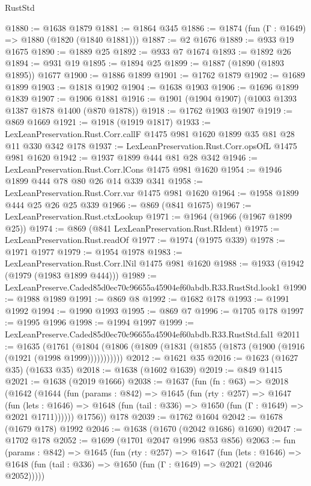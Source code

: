 \begin{lexlean}{RustStd}
\begin{coremodule}
@1880 := @1638 @1879
@1881 := @1864 @345
@1886 := @1874 (fun (Γ : @1649) => @1880 (@1820 (@1840 @1881)))
@1887 := @2 @1676
@1889 := @933 @19 @1675
@1890 := @1889 @25
@1892 := @933 @7 @1674
@1893 := @1892 @26
@1894 := @931 @19
@1895 := @1894 @25
@1899 := @1887 (@1890 (@1893 @1895)) @1677
@1900 := @1886 @1899
@1901 := @1762 @1879
@1902 := @1689 @1899
@1903 := @1818 @1902
@1904 := @1638 @1903
@1906 := @1696 @1899 @1839
@1907 := @1906 @1881
@1916 := @1901 (@1904 @1907) (@1003 @1393 @1387 @1878 @1400 (@870 @1878))
@1918 := @1762 @1903 @1907
@1919 := @869 @1669
@1921 := @1918 (@1919 @1817)
@1933 := LexLeanPreservation.Rust.Corr.callF @1475 @981 @1620 @1899 @35 @81 @28 @11 @330 @342 @178
@1937 := LexLeanPreservation.Rust.Corr.opsOfL @1475 @981 @1620
@1942 := @1937 @1899 @444 @81 @28 @342
@1946 := LexLeanPreservation.Rust.Corr.lCons @1475 @981 @1620
@1954 := @1946 @1899 @444 @78 @80 @26 @14 @339 @341
@1958 := LexLeanPreservation.Rust.Corr.var @1475 @981 @1620
@1964 := @1958 @1899 @444 @25 @26 @25 @339
@1966 := @869 (@841 @1675)
@1967 := LexLeanPreservation.Rust.ctxLookup
@1971 := @1964 (@1966 (@1967 @1899 @25))
@1974 := @869 (@841 LexLeanPreservation.Rust.RIdent)
@1975 := LexLeanPreservation.Rust.readOf
@1977 := @1974 (@1975 @339)
@1978 := @1971 @1977
@1979 := @1954 @1978
@1983 := LexLeanPreservation.Rust.Corr.lNil @1475 @981 @1620
@1988 := @1933 (@1942 (@1979 (@1983 @1899 @444)))
@1989 := LexLeanPreserve.Caded85d0ec70c96655a45904ef60abdb.R33.RustStd.look1
@1990 := @1988 @1989
@1991 := @869 @8
@1992 := @1682 @178
@1993 := @1991 @1992
@1994 := @1990 @1993
@1995 := @869 @7
@1996 := @1705 @178
@1997 := @1995 @1996
@1998 := @1994 @1997
@1999 := LexLeanPreserve.Caded85d0ec70c96655a45904ef60abdb.R33.RustStd.fal1
@2011 := @1635
    (@1761 (@1804 (@1806 (@1809 (@1831 (@1855 (@1873 (@1900 (@1916 (@1921 (@1998 @1999)))))))))))
@2012 := @1621 @35
@2016 := @1623 (@1627 @35) (@1633 @35)
@2018 := @1638 (@1602 @1639)
@2019 := @849 @1415
@2021 := @1638 (@2019 @1666)
@2038 := @1637
    (fun (fn : @63) =>
    @2018
      (@1642
        (@1644
          (fun (params : @842) =>
          @1645
            (fun (rty : @257) =>
            @1647
              (fun (lets : @1646) =>
              @1648 (fun (tail : @336) => @1650 (fun (Γ : @1649) => @2021 @1711))))))
        @1756))
    @178
@2039 := @1762 @1604
@2042 := @1678 (@1679 @178) @1992
@2046 := @1638 (@1670 (@2042 @1686) @1690)
@2047 := @1702 @178
@2052 := @1699 (@1701 @2047 @1996 @853 @856)
@2063 := fun (params : @842) =>
  @1645
    (fun (rty : @257) =>
    @1647
      (fun (lets : @1646) =>
      @1648 (fun (tail : @336) => @1650 (fun (Γ : @1649) => @2021 (@2046 @2052)))))

\end{coremodule}
\end{lexlean}
